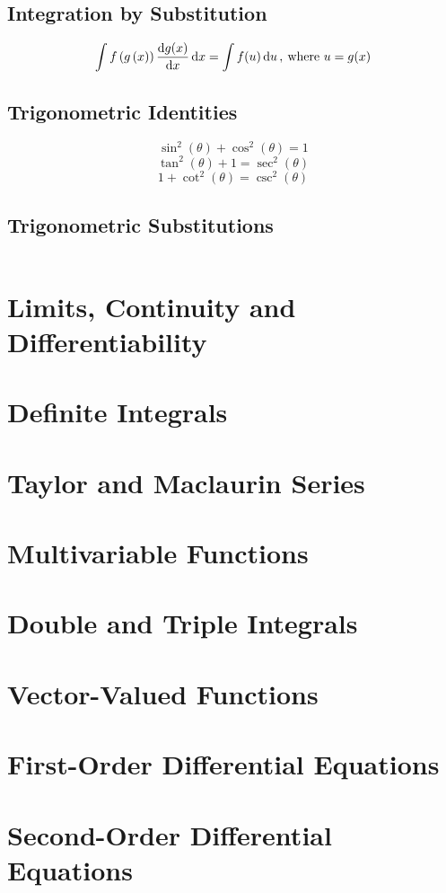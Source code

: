 \documentclass{article}
\begin{document}
\subsection{Integration by Substitution}
\begin{theorem}
    \begin{equation*}
        \int f\left(g\left( x \right)\right)\dv{g(x)}{x} \dd{x} = \int f(u) \dd{u}, \: \text{where } u = g(x)
    \end{equation*}
\end{theorem}
\subsection{Trigonometric Identities}
\begin{equation*}
    \sin^2{\left( \theta \right)} + \cos^2{\left( \theta \right)} = 1
\end{equation*}
\begin{equation*}
    \tan^2{\left( \theta \right)} + 1 = \sec^2{\left( \theta \right)}
\end{equation*}
\begin{equation*}
    1 + \cot^2{\left( \theta \right)} = \csc^2{\left( \theta \right)}
\end{equation*}

\subsection{Trigonometric Substitutions}
\begin{table}[H]
    \centering
    \begin{tabular}{c | c | }
        \toprule
        
        \midrule
        
        \bottomrule
    \end{tabular}
\end{table}
\newpage
\section{Limits, Continuity and Differentiability}

\newpage
\section{Definite Integrals}
\newpage
\section{Taylor and Maclaurin Series}
\newpage
\section{Multivariable Functions}
\newpage
\section{Double and Triple Integrals}
\newpage
\section{Vector-Valued Functions}
\newpage
\section{First-Order Differential Equations}
\newpage
\section{Second-Order Differential Equations}
\newpage
\end{document}
